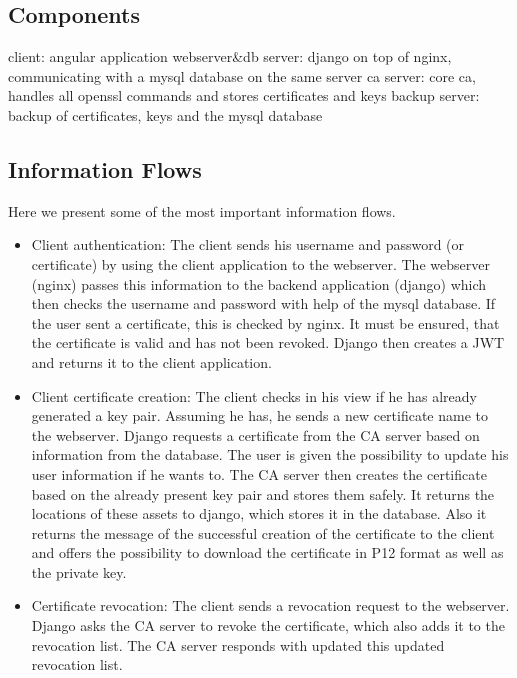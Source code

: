 \documentclass[english]{article}
\begin{document}


\subsection{Components}

  
  client: angular application
  webserver\&db server: django on top of nginx, communicating with a mysql database on the same server
  ca server: core ca, handles all openssl commands and stores certificates and keys
  backup server: backup of certificates, keys and the mysql database

\subsection{Information Flows}

Here we present some of the most important information flows.

\begin{itemize}
	\item Client authentication: The client sends his username and password (or certificate) by using the client application to the webserver. The webserver (nginx) passes this information to the backend application (django) which then checks the username and password with help of the mysql database. If the user sent a certificate, this is checked by nginx. It must be ensured, that the certificate is valid and has not been revoked. Django then creates a JWT and returns it to the client application.
	
	\item Client certificate creation: The client checks in his view if he has already generated a key pair. Assuming he has, he sends a new certificate name to the webserver. Django requests a certificate from the CA server based on information from the database. The user is given the possibility to update his user information if he wants to. The CA server then creates the certificate based on the already present key pair and stores them safely. It returns the locations of these assets to django, which stores it in the database. Also it returns the message of the successful creation of the certificate to the client and offers the possibility to download the certificate in P12 format as well as the private key.
	
	\item Certificate revocation: The client sends a revocation request to the webserver. Django asks the CA server to revoke the certificate, which also adds it to the revocation list. The CA server responds with updated this updated revocation list.
\end{itemize}
\end{document}
